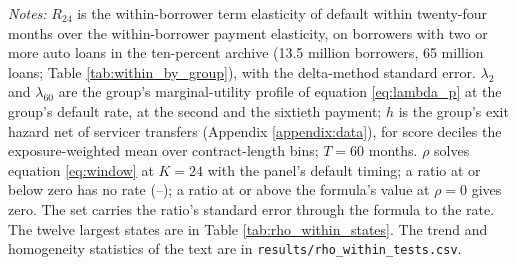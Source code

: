 \begin{table}[H]
\centering
\caption{The rate across people from the within-borrower design}
\label{tab:rho_within}
\small

\vspace{0.5em}
\begin{minipage}{0.92\textwidth}
\noindent \small \textit{Notes:} $R_{24}$ is the within-borrower term elasticity of default within twenty-four months over the within-borrower payment elasticity, on borrowers with two or more auto loans in the ten-percent archive (13.5 million borrowers, 65 million loans; Table \ref{tab:within_by_group}), with the delta-method standard error. $\lambda_2$ and $\lambda_{60}$ are the group's marginal-utility profile of equation \eqref{eq:lambda_p} at the group's default rate, at the second and the sixtieth payment; $h$ is the group's exit hazard net of servicer transfers (Appendix \ref{appendix:data}), for score deciles the exposure-weighted mean over contract-length bins; $T = 60$ months. $\rho$ solves equation \eqref{eq:window} at $K = 24$ with the panel's default timing; a ratio at or below zero has no rate (--); a ratio at or above the formula's value at $\rho = 0$ gives zero. The set carries the ratio's standard error through the formula to the rate. The twelve largest states are in Table \ref{tab:rho_within_states}. The trend and homogeneity statistics of the text are in \texttt{results/rho\_within\_tests.csv}.
\end{minipage}
\end{table}
